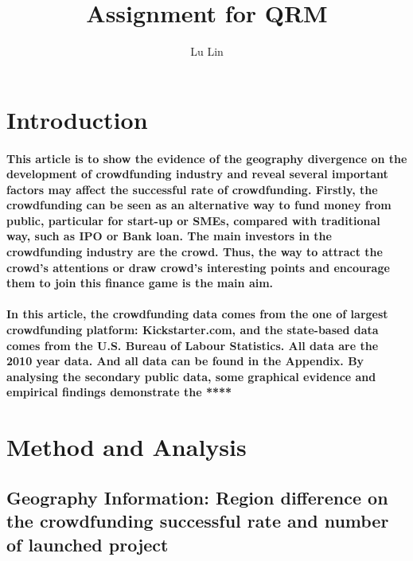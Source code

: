 \documentclass[a4paper,10pt]{article}
\title{Assignment for QRM}
\author{Lu Lin}
\begin{document}
\maketitle




\section{Introduction}

\paragraph{This article is to show the evidence of the geography divergence on the development of crowdfunding industry and reveal several important factors may affect the successful rate of crowdfunding. Firstly, the crowdfunding can be seen as an alternative way to fund money from public, particular for start-up or SMEs, compared with traditional way, such as IPO or Bank loan. The main investors in the crowdfunding industry are the crowd. Thus, the way to attract the crowd’s attentions or draw crowd’s interesting points and encourage them to join this finance game is the main aim. }
\paragraph{In this article, the crowdfunding data comes from the one of largest crowdfunding platform: Kickstarter.com, and the state-based data comes from the U.S. Bureau of Labour Statistics. All data are the 2010 year data. And all data can be found in the Appendix. By analysing the secondary public data, some graphical evidence and empirical findings demonstrate the ****}


\section{Method and Analysis}



\subsection{Geography Information: Region difference on the crowdfunding successful rate and number of launched project}
\end{document}
